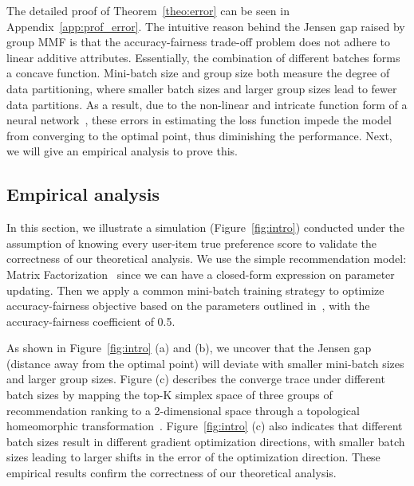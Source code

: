 The detailed proof of Theorem~\ref{theo:error} can be seen in Appendix~\ref{app:prof_error}. The intuitive reason behind the Jensen gap raised by group MMF is that the accuracy-fairness trade-off problem does not adhere to linear additive attributes. Essentially, the combination of different batches forms a concave function. Mini-batch size and group size both measure the degree of data partitioning, where smaller batch sizes and larger group sizes lead to fewer data partitions. As a result, due to the non-linear and intricate function form of a neural network~\citep{sun2019optimization}, these errors in estimating the loss function impede the model from converging to the optimal point, thus diminishing the performance. Next, we will give an empirical analysis to prove this.


\subsection{Empirical analysis}\label{sec:emp_analysis}
In this section,  we illustrate a simulation (Figure~\ref{fig:intro}) conducted under the assumption of knowing every user-item true preference score to validate the correctness of our theoretical analysis. We use the simple recommendation model: Matrix Factorization~\citep{singh2008unified} since we can have a closed-form expression on parameter updating. Then we apply a common mini-batch training strategy to optimize accuracy-fairness objective based on the parameters outlined in~\cite{xu2023p, fairrec}, with the accuracy-fairness coefficient of 0.5.


As shown in Figure~\ref{fig:intro} (a) and (b), we uncover that the Jensen gap (distance away from the optimal point) will deviate with smaller mini-batch sizes and larger group sizes. Figure (c) describes the converge trace under different batch sizes by mapping the top-K simplex space of three groups of recommendation ranking to a 2-dimensional space through a topological homeomorphic transformation~\citep{kozlov2008combinatorial}.
Figure~\ref{fig:intro} (c) also indicates that different batch sizes result in different gradient optimization directions, with smaller batch sizes leading to larger shifts in the error of the optimization direction.
These empirical results confirm the correctness of our theoretical analysis.


